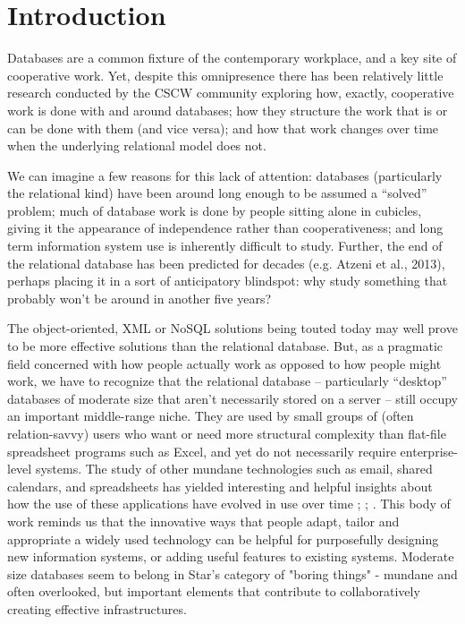 \section{Introduction}

Databases are a common fixture of the contemporary workplace, and a key site of cooperative work. Yet, despite this omnipresence there has been relatively little research conducted by the CSCW community exploring how, exactly, cooperative work is done with and around databases;  how they structure the work that is or can be done with them (and vice versa); and how that work changes over time when the underlying relational model does not. 

We can imagine a few reasons for this lack of attention: databases (particularly the relational kind) have been around long enough to be assumed a “solved” problem; much of database work is done by people sitting alone in cubicles, giving it the appearance of independence rather than cooperativeness; and long term information system use is inherently difficult to study. Further, the end of the relational database has been predicted for decades (e.g. Atzeni et al., 2013), perhaps placing it in a sort of anticipatory blindspot: why study something that probably won’t be around in another five years? 

The object-oriented, XML or NoSQL solutions being touted today may well prove to be more effective solutions than the relational database. But, as a pragmatic field concerned with how people actually work as opposed to how people might work, we have to recognize that the relational database – particularly “desktop” databases of moderate size that aren’t necessarily stored on a server – still occupy an important middle-range niche. They are used by small groups of (often relation-savvy) users who want or need more structural complexity than flat-file spreadsheet programs such as Excel, and yet do not necessarily require enterprise-level systems. The study of other mundane technologies such as email, shared calendars, and spreadsheets has yielded interesting and helpful insights about how the use of these applications have evolved in use over time  \cite{bellotti2005quality}; \cite{palen1999social};  \cite{nardi1991twinkling}. This body of work reminds us that the innovative ways that people adapt, tailor and appropriate a widely used technology can be helpful for purposefully designing new information systems, or adding useful features to existing systems. Moderate size databases seem to  belong in Star's category of "boring things" \cite{star1999ethnography} -  mundane and often overlooked, but important elements that contribute to collaboratively creating effective infrastructures.  

